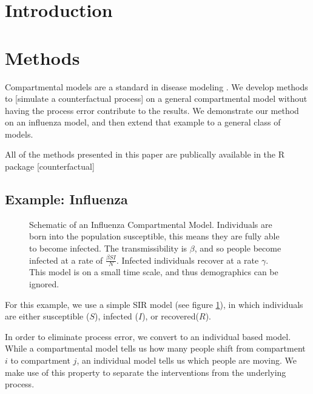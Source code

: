 \documentclass{article}
\newcommand{\R}{R\,}
\begin{document}
\section{Introduction}
\section{Methods}
Compartmental models are a standard in disease modeling \cite{}.%
We develop methods to [simulate a counterfactual process] %
on a general compartmental model without having the process error contribute to the results.  We demonstrate our method on an influenza model, and then extend that example to a general class of models.

All of the methods presented in this paper are publically available in the \R package [counterfactual] %

\subsection*{Example: Influenza}

\begin{figure}
\label{fig:sir}
\begin{center}
\end{center}
\caption{Schematic of an Influenza Compartmental Model. Individuals are born into the population susceptible, this means they are fully able to become infected.  The transmissibility is $\beta$, and so people become infected at a rate of $\frac{\beta SI}{N}$.  Infected individuals recover at a rate $\gamma$.  This model is on a small time scale, and thus demographics can be ignored.}
\end{figure}

For this example, we use a simple SIR model (see figure \ref{fig:sir}), in which individuals are either susceptible ($S$), infected ($I$), or recovered($R$).

In order to eliminate process error, we convert to an individual based model.  While a compartmental model tells us how many people shift from compartment $i$ to compartment $j$, an individual model tells us which people are moving.  We make use of this property to separate the interventions from the underlying process.
\end{document}
